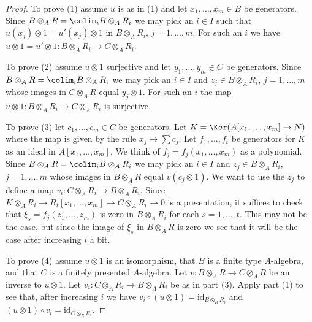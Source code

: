 \begin{proof}
To prove (1) assume $u$ is as in (1) and
let $x_1, \ldots, x_m \in B$ be generators. Since
$B \otimes_A R = \colim_i B \otimes_A R_i$
we may pick an $i \in I$ such that $u(x_j) \otimes 1 = u'(x_j) \otimes 1$
in $B \otimes_A R_i$, $j = 1, \ldots, m$.
For such an $i$ we have
$u \otimes 1 = u' \otimes 1 : B \otimes_A R_i \to C \otimes_A R_i$.

\medskip\noindent
To prove (2) assume $u \otimes 1$ surjective and
let $y_1, \ldots, y_m \in C$ be generators. Since
$B \otimes_A R = \colim_i B \otimes_A R_i$
we may pick an $i \in I$ and $z_j \in B \otimes_A R_i$, $j = 1, \ldots, m$
whose images in $C \otimes_A R$ equal $y_j \otimes 1$.
For such an $i$ the map $u \otimes 1 : B \otimes_A R_i \to C \otimes_A R_i$
is surjective.

\medskip\noindent
To prove (3) let $c_1, \ldots, c_m \in C$ be generators. Let
$K = \Ker(A[x_1, \ldots, x_m] \to N)$ where the map is given by
the rule $x_j \mapsto \sum c_j$. Let $f_1, \ldots, f_t$
be generators for $K$ as an ideal in $A[x_1, \ldots, x_m]$.
We think of $f_j = f_j(x_1, \ldots, x_m)$ as a polynomial.
Since $B \otimes_A R = \colim_i B \otimes_A R_i$
we may pick an $i \in I$ and $z_j \in B \otimes_A R_i$, $j = 1, \ldots, m$
whose images in $B \otimes_A R$ equal $v(c_j \otimes 1)$.
We want to use the $z_j$ to define a map
$v_i : C \otimes_A R_i \to B \otimes_A R_i$.
Since $K \otimes_A R_i \to R_i[x_1, \ldots, x_m] \to C \otimes_A R_i \to 0$
is a presentation, it suffices to check that
$\xi_s = f_j(z_1, \ldots, z_m)$ is
zero in $B \otimes_A R_i$ for each $s = 1, \ldots, t$. This may not
be the case, but since the image of $\xi_s$ in $B \otimes_A R$ is zero
we see that it will be the case after increasing $i$ a bit.

\medskip\noindent
To prove (4) assume $u \otimes 1$ is an isomorphism, that
$B$ is a finite type $A$-algebra, and that $C$ is a finitely presented
$A$-algebra. Let $v : B \otimes_A R \to C \otimes_A R$ be an inverse to
$u \otimes 1$. Let $v_i : C \otimes_A R_i \to B \otimes_A R_i$ be as
in part (3). Apply part (1) to see that, after increasing $i$ we have
$v_i \circ (u \otimes 1) = \text{id}_{B \otimes_R R_i}$ and
$(u \otimes 1) \circ v_i = \text{id}_{C \otimes_R R_i}$.
\end{proof}

